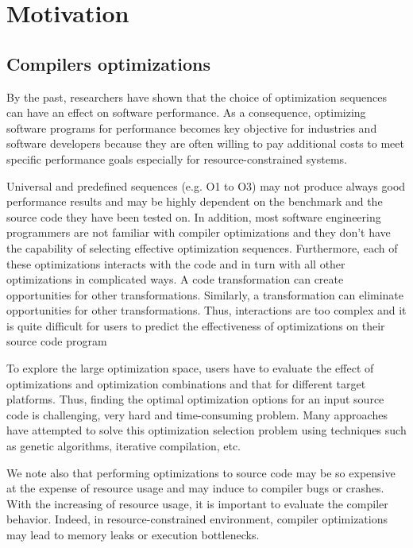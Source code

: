 \section{Motivation}
\subsection{Compilers optimizations}
By the past, researchers have shown that the choice of optimization sequences can have an effect on software performance\cite{almagor2004finding,chen2012deconstructing}. As a consequence, optimizing software programs for performance becomes key objective for industries and software developers because they are often willing to pay additional costs to meet specific performance goals especially for resource-constrained systems.

Universal and predefined sequences (e.g. O1 to O3) may not produce always good performance results and may be highly dependent on the benchmark and the source code they have been tested on\cite{almagor2004finding}\cite{hoste2008cole}.
In addition, most software engineering programmers are
not familiar with compiler optimizations and they don't have
the capability of selecting effective optimization sequences.
Furthermore, each of these optimizations interacts with the
code and in turn with all other optimizations in complicated
ways. A code transformation can create opportunities for other transformations. Similarly, a transformation can eliminate opportunities for other transformations. Thus, interactions are too complex and it is quite difficult for users to predict the effectiveness of optimizations on their source code program

To explore the large optimization space, users have to
evaluate the effect of optimizations and optimization combinations and that for different target platforms. Thus, finding the optimal optimization options for an input source code is challenging, very hard and time-consuming problem. Many approaches have attempted to solve this optimization selection problem using techniques such as genetic algorithms, iterative compilation, etc\cite{hoste2008cole,zhong2009tuning,sandran2012genetic,martins2014exploration}.



We note also that performing optimizations to source code
may be so expensive at the expense of resource usage and
may induce to compiler bugs or crashes. With the increasing
of resource usage, it is important to evaluate the compiler
behavior. Indeed, in resource-constrained environment, compiler optimizations may lead to memory leaks or execution
bottlenecks. 


